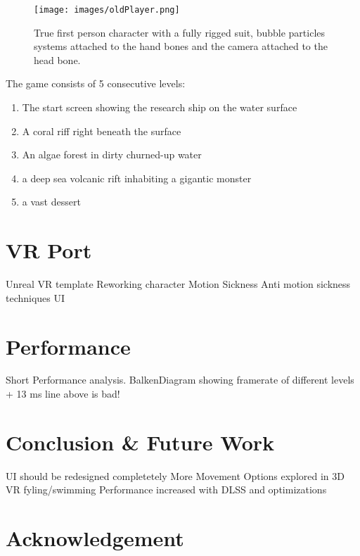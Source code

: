 \documentclass[letterpaper, 10 pt, conference]{ieeeconf}  %
\begin{document}
\begin{figure}[!ht]
    \caption{True first person character with a fully rigged suit, bubble particles systems attached to the hand bones and the camera attached to the head bone.}
    \centering
    \texttt{[image: images/oldPlayer.png]}
    \label{fig:oldPlayer}
\end{figure}

The game consists of 5 consecutive levels:
\begin{enumerate}
    \item The start screen showing the research ship on the water surface
    \item A coral riff right beneath the surface
    \item An algae forest in dirty churned-up water
    \item a deep sea volcanic rift inhabiting a gigantic monster
    \item a vast dessert
\end{enumerate}



\section{VR Port}
\label{Sec:VR}
Unreal VR template
Reworking character
Motion Sickness
Anti motion sickness techniques
UI

\section{Performance}
\label{Sec:Performance}

Short Performance analysis.
BalkenDiagram showing framerate of different levels + 13 ms line above is bad!

\section{Conclusion \& Future Work}
\label{Sec:ConcFuture}

UI should be redesigned completetely
More Movement Options explored in 3D VR fyling/swimming
Performance increased with DLSS and optimizations

\section*{Acknowledgement}
\label{Sec:Acknowledgement}
\end{document}

